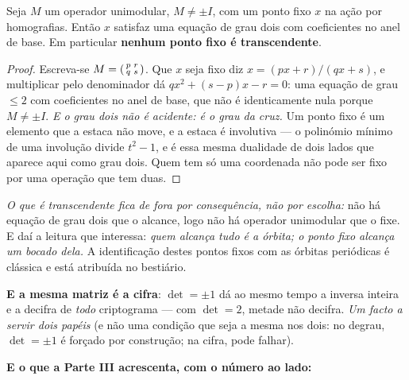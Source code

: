 \documentclass[livro.tex]{subfiles}
\begin{document}
\begin{mdframed}[linewidth=0.4pt,innerleftmargin=10pt,innerrightmargin=10pt,
                 innertopmargin=8pt,innerbottommargin=8pt,skipabove=6pt,skipbelow=6pt]
\medskip
\begin{teorema}\label{thm:pontofixo}
Seja $M$ um operador unimodular, $M\neq\pm I$, com um ponto fixo $x$ na ação por homografias.
Então $x$ satisfaz uma equação de grau dois com coeficientes no anel de base. Em particular
\textbf{nenhum ponto fixo é transcendente}.
\end{teorema}

\begin{proof}
Escreva-se $M=\begin{psmallmatrix}p&r\\ q&s\end{psmallmatrix}$. Que $x$ seja fixo diz
$x=(px+r)/(qx+s)$, e multiplicar pelo denominador dá $qx^{2}+(s-p)x-r=0$: uma equação de grau
$\leq 2$ com coeficientes no anel de base, que não é identicamente nula porque $M\neq\pm I$.
\emph{E o grau dois não é acidente: é o grau da cruz.} Um ponto fixo é um elemento que a estaca
não move, e a estaca é involutiva --- o polinómio mínimo de uma involução divide $t^{2}-1$, e é
essa mesma dualidade de dois lados que aparece aqui como grau dois. Quem tem só uma coordenada
não pode ser fixo por uma operação que tem duas.
\end{proof}

\noindent \emph{O que é transcendente fica de fora por consequência, não por escolha:} não há
equação de grau dois que o alcance, logo não há operador unimodular que o fixe. E daí a leitura
que interessa: \emph{quem alcança tudo é a órbita; o ponto fixo alcança um bocado dela.} A
identificação destes pontos fixos com as órbitas periódicas é clássica e está atribuída no
bestiário.

\medskip
\noindent \textbf{E a mesma matriz é a cifra}: $\det=\pm1$ dá ao mesmo tempo a inversa inteira e a
decifra de \emph{todo} criptograma --- com $\det=2$, metade não decifra. \emph{Um facto a servir
dois papéis} (e não uma condição que seja a mesma nos dois: no degrau, $\det=\pm1$ é forçado por
construção; na cifra, pode falhar).

\medskip
\medskip
\noindent \textbf{E o que a Parte III acrescenta, com o número ao lado:}


\end{mdframed}
\end{document}
